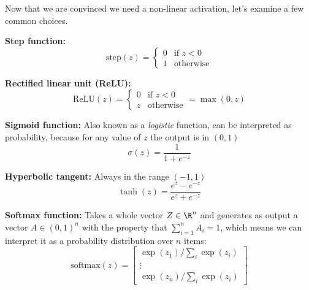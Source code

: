 Now that we are convinced we need a non-linear activation, let's
examine a few common choices.
\begin{description}
  \item{\bf Step function:} 
    $$\text{step}(z) =
    \begin{cases}
      0 & \text{if $z<0$}\\
      1 & \text{otherwise}
    \end{cases}$$
  \item{\bf Rectified linear unit (ReLU):} 
    $$\text{ReLU}(z) =
    \begin{cases}
      0 & \text{if $z<0$}\\
      z & \text{otherwise}
    \end{cases} = \max(0,z)$$ 
  \item{\bf Sigmoid function:} Also known as a {\em logistic} function, can
    be interpreted as probability, because for any value of $z$ the
    output is in $(0, 1)$
    $$\sigma(z) = \frac{1}{1+e^{-z}}$$
  \item{\bf Hyperbolic tangent:} Always in the range $(-1, 1)$
 $$\tanh(z) = \frac{e^z - e^{-z}}{e^z + e^{-z}}$$
\item{\bf Softmax function:}
Takes a whole vector $Z \in \R^n$ and generates as output a vector
$A \in (0, 1)^n$ with the property that $\sum_{i = 1}^n A_i = 1$,
which means we can interpret it as a probability distribution over $n$ items:
\[\text{softmax}(z) =
  \begin{bmatrix}
    \exp(z_1) / \sum_{i} \exp(z_i) \\
    \vdots \\
    \exp(z_n) / \sum_{i} \exp(z_i)
\end{bmatrix}\]

\end{description}

